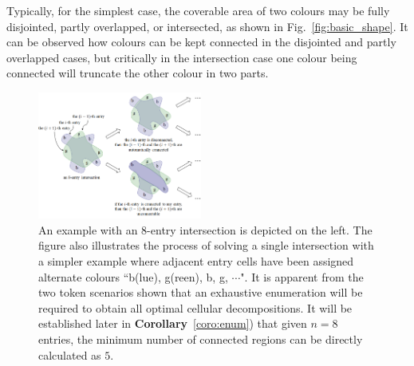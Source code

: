 \documentclass[journal]{IEEEtran}
\begin{document}
Typically, for the simplest case, the coverable area of two colours may be fully disjointed, partly overlapped, or intersected, as shown in Fig.~\ref{fig:basic_shape}. It can be observed how colours can be kept connected in the disjointed and partly overlapped cases, but critically in the intersection case one colour being connected will truncate the other colour in two parts.

\begin{figure}[t]
\centering
\includegraphics[width = 0.48\textwidth]{figures/new_multi_entry}
\caption{An example with an $8$-entry intersection is depicted on the left. The figure also illustrates the process of solving a single intersection with a simpler example where adjacent entry cells have been assigned %
alternate colours ``b(lue), g(reen), b, g, $\cdots$".  
It is apparent from the two token scenarios shown that an exhaustive enumeration will be required to obtain all optimal cellular decompositions.
It will be established later in \textbf{Corollary}~\ref{coro:enum}) that given $n = 8$ entries, the minimum number of connected regions can be directly calculated as $5$.  %
}\label{fig:multi_entry}
\end{figure}
\end{document}
